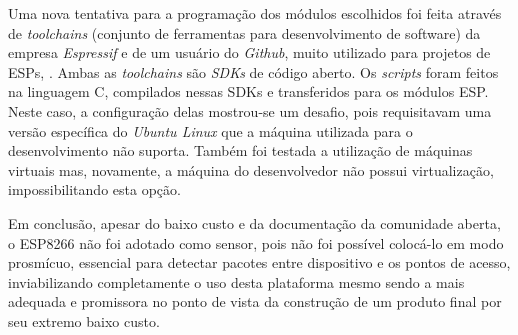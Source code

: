 Uma nova tentativa para a programação  dos módulos escolhidos foi feita através de
\emph{toolchains} (conjunto de ferramentas para desenvolvimento de software) da
empresa \emph{Espressif} e de um usuário do \emph{Github}, muito utilizado para
projetos de ESPs, . Ambas as \emph{toolchains}
são \emph{SDKs} de código aberto. Os \emph{scripts} foram feitos na linguagem C,
compilados nessas SDKs e transferidos para os módulos ESP. Neste caso,
a configuração delas mostrou-se um desafio, pois requisitavam uma versão
específica do \emph{Ubuntu Linux} que a máquina utilizada para o desenvolvimento
não suporta. Também foi testada a utilização de máquinas virtuais mas, novamente,
a máquina do desenvolvedor não possui virtualização, impossibilitando esta opção.

Em conclusão, apesar do baixo custo e da documentação da comunidade aberta, o
ESP8266 não foi adotado como sensor, pois não foi possível colocá-lo em modo
prosmícuo, essencial para detectar pacotes entre dispositivo e os pontos de
acesso, inviabilizando completamente o uso desta plataforma mesmo sendo a
mais adequada e promissora no ponto de vista da construção de um produto final
por seu extremo baixo custo.
